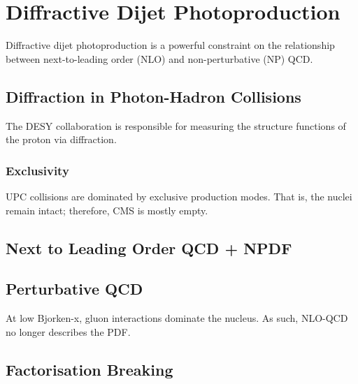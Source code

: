 
\chapter{Diffractive Dijet Photoproduction}

Diffractive dijet photoproduction is a powerful constraint on the relationship between next-to-leading order (NLO) and non-perturbative (NP) QCD.

\section{Diffraction in Photon-Hadron Collisions}

The DESY collaboration is responsible for measuring the structure functions of the proton via diffraction.

\subsection{Exclusivity}

UPC collisions are dominated by exclusive production modes. That is, the nuclei remain intact; therefore, CMS is mostly empty.

\section{Next to Leading Order QCD + NPDF}



\section{Perturbative QCD}

At low Bjorken-x, gluon interactions dominate the nucleus. As such, NLO-QCD no longer describes the PDF.

\section{Factorisation Breaking}

